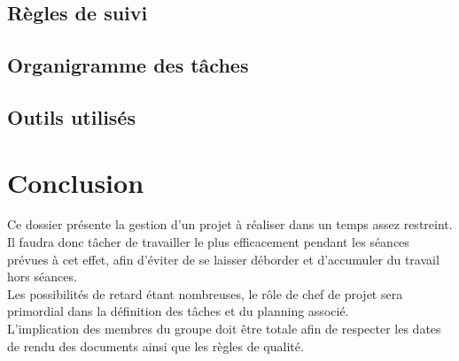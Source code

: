 \subsection{Règles de suivi}

\subsection{Organigramme des tâches}

\subsection{Outils utilisés}

\section{Conclusion}
Ce dossier présente la gestion d'un projet à réaliser dans un temps assez restreint. Il faudra donc tâcher de travailler le plus efficacement pendant les séances prévues à cet effet, afin d'éviter de se laisser déborder et d'accumuler du travail hors séances.\\
Les possibilités de retard étant nombreuses, le rôle de chef de projet sera primordial dans la définition des tâches et du planning associé.\\
L'implication des membres du groupe doit être totale afin de respecter les dates de rendu des documents ainsi que les règles de qualité.

